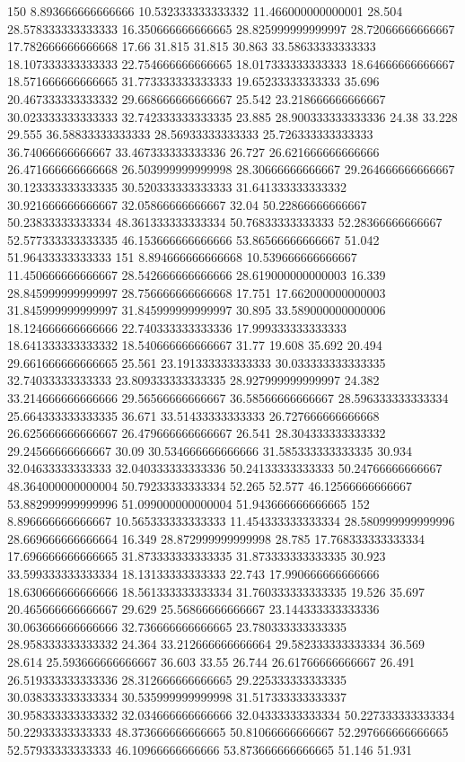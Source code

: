 150 8.893666666666666 10.532333333333332 11.466000000000001 28.504 28.578333333333333 16.350666666666665 28.825999999999997 28.72066666666667 17.782666666666668 17.66 31.815 31.815 30.863 33.58633333333333 18.107333333333333 22.754666666666665 18.017333333333333 18.64666666666667 18.571666666666665 31.773333333333333 19.65233333333333 35.696 20.467333333333332 29.668666666666667 25.542 23.218666666666667 30.023333333333333 32.742333333333335 23.885 28.900333333333336 24.38 33.228 29.555 36.58833333333333 28.56933333333333 25.726333333333333 36.74066666666667 33.467333333333336 26.727 26.621666666666666 26.471666666666668 26.503999999999998 28.30666666666667 29.264666666666667 30.123333333333335 30.520333333333333 31.641333333333332 30.921666666666667 32.05866666666667 32.04 50.22866666666667 50.23833333333334 48.361333333333334 50.76833333333333 52.28366666666667 52.577333333333335 46.153666666666666 53.86566666666667 51.042 51.96433333333333
151 8.894666666666668 10.539666666666667 11.450666666666667 28.542666666666666 28.619000000000003 16.339 28.845999999999997 28.756666666666668 17.751 17.662000000000003 31.845999999999997 31.845999999999997 30.895 33.589000000000006 18.124666666666666 22.740333333333336 17.999333333333333 18.641333333333332 18.540666666666667 31.77 19.608 35.692 20.494 29.661666666666665 25.561 23.191333333333333 30.033333333333335 32.74033333333333 23.809333333333335 28.927999999999997 24.382 33.214666666666666 29.56566666666667 36.58566666666667 28.596333333333334 25.664333333333335 36.671 33.51433333333333 26.727666666666668 26.625666666666667 26.479666666666667 26.541 28.304333333333332 29.24566666666667 30.09 30.534666666666666 31.585333333333335 30.934 32.04633333333333 32.040333333333336 50.24133333333333 50.24766666666667 48.364000000000004 50.79233333333334 52.265 52.577 46.12566666666667 53.882999999999996 51.099000000000004 51.943666666666665
152 8.896666666666667 10.565333333333333 11.454333333333334 28.580999999999996 28.669666666666664 16.349 28.872999999999998 28.785 17.768333333333334 17.696666666666665 31.873333333333335 31.873333333333335 30.923 33.599333333333334 18.13133333333333 22.743 17.990666666666666 18.630666666666666 18.561333333333334 31.760333333333335 19.526 35.697 20.465666666666667 29.629 25.56866666666667 23.144333333333336 30.063666666666666 32.736666666666665 23.780333333333335 28.958333333333332 24.364 33.212666666666664 29.582333333333334 36.569 28.614 25.593666666666667 36.603 33.55 26.744 26.61766666666667 26.491 26.519333333333336 28.312666666666665 29.225333333333335 30.038333333333334 30.535999999999998 31.517333333333337 30.958333333333332 32.034666666666666 32.04333333333334 50.227333333333334 50.22933333333333 48.373666666666665 50.81066666666667 52.297666666666665 52.57933333333333 46.10966666666666 53.873666666666665 51.146 51.931
